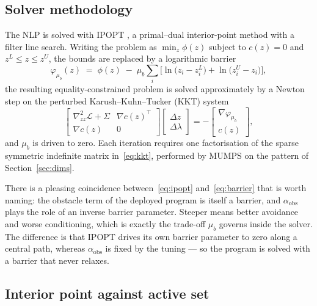 \documentclass[11pt,a4paper]{article}
\newcommand{\aobs}{\alpha_{\mathrm{obs}}}
\begin{document}
\subsection{Solver methodology}
\label{sec:solver}

The NLP is solved with IPOPT \cite{wachter2006ipopt}, a primal--dual interior-point method with a filter
line search. Writing the problem as $\min_z \phi(z)$ subject to $c(z)=0$ and $z^L\le z\le z^U$, the bounds
are replaced by a logarithmic barrier
\begin{equation}
  \varphi_{\mu_b}(z) \;=\; \phi(z) \;-\; \mu_b\sum_i\Big[\ln\!\big(z_i-z_i^L\big)+\ln\!\big(z_i^U-z_i\big)\Big],
  \label{eq:ipopt}
\end{equation}
the resulting equality-constrained problem is solved approximately by a Newton step on the perturbed Karush--Kuhn--Tucker (KKT)
system
\begin{equation}
  \begin{bmatrix}
    \nabla^2_{zz}\mathcal{L} + \Sigma & \nabla c(z)^{\!\top}\\
    \nabla c(z) & 0
  \end{bmatrix}
  \begin{bmatrix}\Delta z\\ \Delta\lambda\end{bmatrix}
  = -\begin{bmatrix}\nabla\varphi_{\mu_b}\\ c(z)\end{bmatrix},
  \label{eq:kkt}
\end{equation}
and $\mu_b$ is driven to zero. Each iteration requires one factorisation of the sparse symmetric indefinite
matrix in~\eqref{eq:kkt}, performed by MUMPS on the pattern of Section~\ref{sec:dims}.

There is a pleasing coincidence between~\eqref{eq:ipopt} and~\eqref{eq:barrier} that is worth naming: the
obstacle term of the deployed program is itself a barrier, and $\aobs$ plays the role of an inverse barrier
parameter. Steeper means better avoidance and worse conditioning, which is exactly the trade-off $\mu_b$
governs inside the solver. The difference is that IPOPT drives its own barrier parameter to zero along a
central path, whereas $\aobs$ is fixed by the tuning --- so the program is solved with a barrier that never
relaxes.

\subsection{Interior point against active set}
\label{sec:solvercmp}
\end{document}

